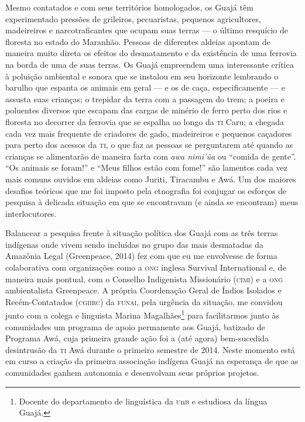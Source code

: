 Mesmo contatados e com seus territórios homologados, os Guajá têm
experimentado pressões de grileiros, pecuaristas, pequenos agricultores,
madeireiros e narcotraficantes que ocupam suas terras --- o último
resquício de floresta no estado do Maranhão. Pessoas de diferentes
aldeias apontam de maneira muito direta os efeitos do desmatamento e da
existência de uma ferrovia na borda de uma de suas terras. Os Guajá
empreendem uma interessante crítica à poluição ambiental e sonora que se
instalou em seu horizonte lembrando o barulho que espanta os animais em
geral --- e os de caça, especificamente --- e assusta suas crianças; o
trepidar da terra com a passagem do trem; a poeira e poluentes diversos
que escapam das cargas de minério de ferro perto dos rios e floresta no
decorrer da ferrovia que se espalha ao longo da \textsc{ti} Caru; a chegada cada
vez mais frequente de criadores de gado, madeireiros e pequenos
caçadores para perto dos acessos da \textsc{ti}, o que faz as pessoas se
perguntarem até quando as crianças se alimentarão de maneira farta com
\textit{awa nimi'ũa} ou ``comida de gente''. ``Os animais se foram!'' e
``Meus filhos estão com fome!'' são lamentos cada vez mais comuns
ouvidos em aldeias como Juriti, Tiracambu e Awá. Um dos maiores desafios
teóricos que me foi imposto pela etnografia foi conjugar os esforços de
pesquisa à delicada situação em que se encontravam (e ainda se
encontram) meus interlocutores.

Balancear a pesquisa frente à situação política dos Guajá com as três
terras indígenas onde vivem sendo incluídas no grupo das mais desmatadas
da Amazônia Legal (Greenpeace, 2014) fez com que eu me envolvesse de
forma colaborativa com organizações como a \textsc{ong} inglesa Survival
International e, de maneira mais pontual, com o Conselho Indigenista
Missionário (\textsc{cimi}) e a \textsc{ong} ambientalista Greenpeace. A própria
Coordenação Geral de Índios Isolados e Recém-Contatados (\textsc{cgiirc}) da
\textsc{funai}, pela urgência da situação, me convidou junto com a colega e
linguista Marina Magalhães\footnote{Docente do departamento de linguística da
\textsc{u}n\textsc{b} e estudiosa da língua Guajá.} para facilitarmos junto às comunidades
um programa de apoio permanente aos Guajá, batizado de Programa Awá,
cuja primeira grande ação foi a (até agora) bem-sucedida desintrusão da
\textsc{ti} Awá durante o primeiro semestre de 2014. Neste momento está em curso
a criação da primeira associação indígena Guajá na esperança de que as
comunidades ganhem autonomia e desenvolvam seus próprios projetos.

